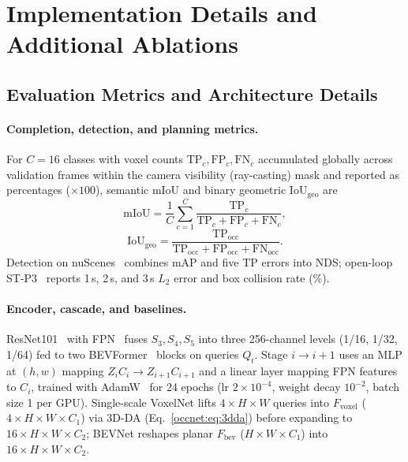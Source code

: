 \section{Implementation Details and Additional Ablations}\label{app:occnet}

\subsection{Evaluation Metrics and Architecture Details}\label{occnet:app:metrics}\label{occnet:app:implementation}

\paragraph{Completion, detection, and planning metrics.} For $C=16$ classes with voxel counts $\text{TP}_c, \text{FP}_c, \text{FN}_c$ accumulated globally across validation frames within the camera visibility (ray-casting) mask and reported as percentages ($\times 100$), semantic mIoU and binary geometric $\text{IoU}_{\text{geo}}$ are
\begin{equation}
  \text{mIoU} = \frac{1}{C}\sum_{c=1}^{C}\frac{\text{TP}_c}{\text{TP}_c+\text{FP}_c+\text{FN}_c},
  \label{occnet:eq:miou}
\end{equation}
\begin{equation}
  \text{IoU}_{\text{geo}} = \frac{\text{TP}_{\text{occ}}}{\text{TP}_{\text{occ}}+\text{FP}_{\text{occ}}+\text{FN}_{\text{occ}}}.
  \label{occnet:eq:iougeo}
\end{equation}
Detection on nuScenes~\cite{caesar2020nuscenes} combines mAP and five TP errors into NDS; open-loop ST-P3~\cite{hu2022stp3} reports 1\,s, 2\,s, and 3\,s $L_2$ error and box collision rate (\%).

\paragraph{Encoder, cascade, and baselines.} ResNet101~\cite{he2016deep} with FPN~\cite{lin2017feature} fuses $S_3, S_4, S_5$ into three 256-channel levels (1/16, 1/32, 1/64) fed to two BEVFormer~\cite{li2022bevformer} blocks on queries $Q_t$. Stage $i\to i+1$ uses an MLP at $(h,w)$ mapping $Z_i C_i\to Z_{i+1} C_{i+1}$ and a linear layer mapping FPN features to $C_i$, trained with AdamW~\cite{loshchilov2017decoupled} for 24 epochs (lr $2\times10^{-4}$, weight decay $10^{-2}$, batch size 1 per GPU). Single-scale VoxelNet lifts $4\times H\times W$ queries into $F_{\text{voxel}}$ ($4\times H\times W\times C_1$) via 3D-DA (Eq.~\eqref{occnet:eq:3dda}) before expanding to $16\times H\times W\times C_2$; BEVNet reshapes planar $F_{\text{bev}}$ ($H\times W\times C_1$) into $16\times H\times W\times C_2$.

